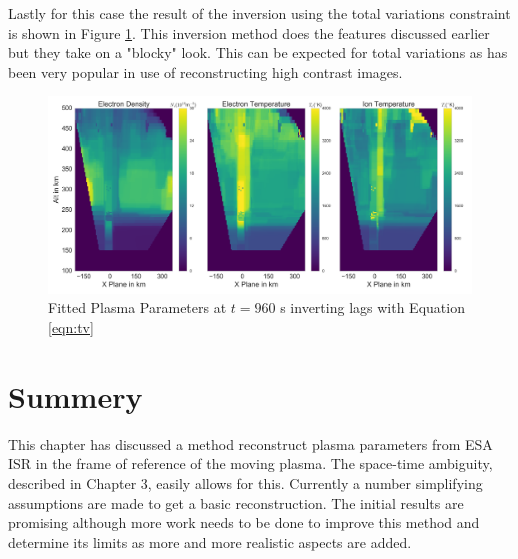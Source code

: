 Lastly for this case the result of the inversion using the total variations constraint is shown in Figure \ref{fig:tv}. This inversion method does the features discussed earlier but they take on a "blocky" look. This can be expected for total variations as has been very popular in use of reconstructing high contrast images\citep{Karl:2005jy}.
\begin{figure}[!ht]
\centering
\includegraphics[width=6in]{tvfitted}
\caption{Fitted Plasma Parameters at $t=960$ s inverting lags with Equation \ref{eqn:tv}}
\label{fig:tv}
\end{figure}

\section{Summery}

This chapter has discussed a method reconstruct plasma parameters from ESA ISR in the frame of reference of the moving plasma. The space-time ambiguity, described in Chapter 3, easily allows for this. Currently a number simplifying assumptions are made to get a basic reconstruction. The initial results are promising although more work needs to be done to improve this method and determine its limits as more and more realistic aspects are added.